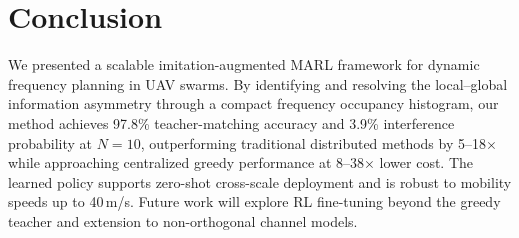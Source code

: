 \documentclass[journal]{IEEEtran}
\begin{document}
\section{Conclusion}
\label{sec:conclusion}

We presented a scalable imitation-augmented MARL framework for dynamic frequency planning in UAV swarms. By identifying and resolving the local--global information asymmetry through a compact frequency occupancy histogram, our method achieves 97.8\% teacher-matching accuracy and 3.9\% interference probability at $N=10$, outperforming traditional distributed methods by 5--18$\times$ while approaching centralized greedy performance at 8--38$\times$ lower cost. The learned policy supports zero-shot cross-scale deployment and is robust to mobility speeds up to 40\,m/s. Future work will explore RL fine-tuning beyond the greedy teacher and extension to non-orthogonal channel models.
\end{document}
